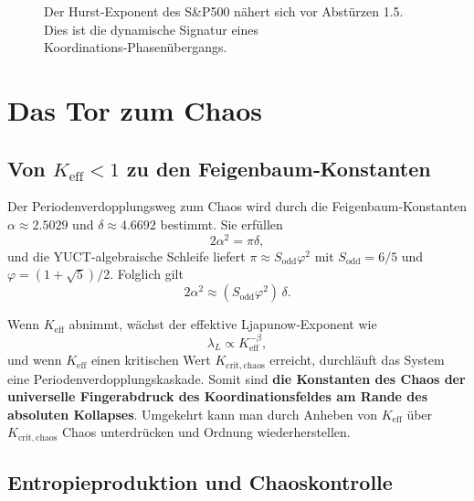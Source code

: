 \documentclass[12pt,a4paper]{article}
\newcommand{\Keff}{K_{\mathrm{eff}}}
\begin{document}
	\begin{figure}[H]
		\centering
		\caption{Der Hurst‑Exponent des S\&P500 nähert sich vor Abstürzen 1.5.
			Dies ist die dynamische Signatur eines Koordinations‑Phasenübergangs.}
		\label{fig:hurst}
	\end{figure}
	
	\section{Das Tor zum Chaos}
	
	\subsection{Von $\Keff < 1$ zu den Feigenbaum‑Konstanten}
	
	Der Periodenverdopplungsweg zum Chaos wird durch die Feigenbaum‑Konstanten
	$\alpha \approx 2.5029$ und $\delta \approx 4.6692$ bestimmt. Sie erfüllen
	\[
	2\alpha^2 = \pi \delta,
	\]
	und die YUCT‑algebraische Schleife liefert $\pi \approx S_{\mathrm{odd}}\varphi^2$ mit
	$S_{\mathrm{odd}}=6/5$ und $\varphi = (1+\sqrt{5})/2$. Folglich gilt
	\[
	2\alpha^2 \approx (S_{\mathrm{odd}}\varphi^2)\,\delta.
	\]
	
	Wenn $\Keff$ abnimmt, wächst der effektive Ljapunow‑Exponent wie
	\[
	\lambda_L \propto \Keff^{-\beta},
	\]
	und wenn $\Keff$ einen kritischen Wert $K_{\mathrm{crit,chaos}}$ erreicht, durchläuft das System
	eine Periodenverdopplungskaskade. Somit sind \textbf{die Konstanten des Chaos der universelle
		Fingerabdruck des Koordinationsfeldes am Rande des absoluten Kollapses}. Umgekehrt kann man
	durch Anheben von $\Keff$ über $K_{\mathrm{crit,chaos}}$ Chaos unterdrücken und Ordnung wiederherstellen.
	
	\subsection{Entropieproduktion und Chaoskontrolle}
	
\end{document}

